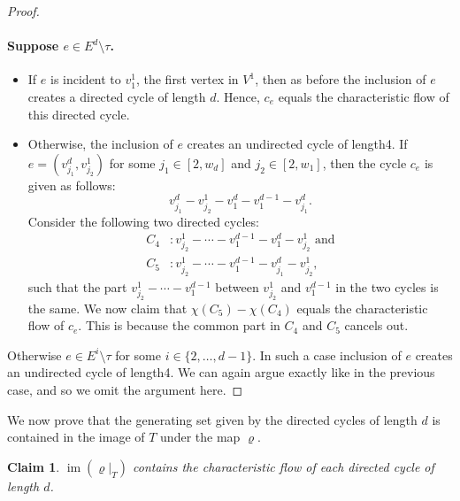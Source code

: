 \documentclass[10pt,a4paper]{article}
\newtheorem{claim}[theorem]{Claim}
\newcommand{\C}{\mathbb C}
\DeclareMathOperator{\im}{im}
\begin{document}
\begin{proof}
\paragraph{Suppose $e\in E^d\setminus\tau$.}
\begin{itemize}
\item If $e$ is incident to $v^1_1$, the first vertex in $V^1$, then as before the inclusion of $e$ creates a directed cycle of length $d$. Hence, $c_e$ equals the characteristic flow of this directed cycle.
\item Otherwise, the inclusion of $e$ creates an undirected cycle of length4. If $e=(v^d_{j_1},v^1_{j_2})$ for some $j_1\in[2,w_d]$ and $j_2\in[2,w_1]$, then the cycle $c_e$ is given as follows:
\[v^d_{j_1}-v^1_{j_2}-v^d_1-v^{d-1}_1-v^d_{j_1}.\]
Consider the following two directed cycles:
\begin{align*}C_4&:v^1_{j_2}-\cdots-v^{d-1}_1-v^d_1-v^1_{j_2}\text{ and}\\C_5&:v^1_{j_2}-\cdots-v^{d-1}_1-v^d_{j_1}-v^1_{j_2},\end{align*}
such that the part $v^1_{j_2}-\cdots-v^{d-1}_1$ between $v^1_{j_2}$ and $v^{d-1}_1$ in the two cycles is the same. We now claim that $\chi(C_5)-\chi(C_4)$ equals the characteristic flow of $c_e$. This is because the common part in $C_4$ and $C_5$ cancels out.
\end{itemize}
Otherwise $e\in E^i\setminus\tau$ for some $i\in\{2,\ldots,d-1\}$. In such a case inclusion of $e$ creates an undirected cycle of length4. We can again argue exactly like in the previous case, and so we omit the argument here.
\end{proof}
We now prove that the generating set given by the directed cycles of length $d$ is contained in the image of $T$ under the map $\varrho$.
\begin{claim}$\im(\varrho|_T)$ contains the characteristic flow of each directed cycle of length $d$.\end{claim}
\end{document}
